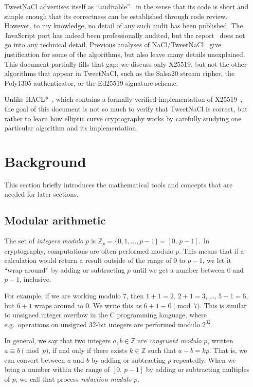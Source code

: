 \documentclass[manuscript]{acmart}
\begin{document}
TweetNaCl advertises itself as ``auditable''~\cite{Bernstein:2014ca} in the sense that its code is short and simple enough that its correctness can be established through code review.
However, to my knowledge, no detail of any such audit has been published.
The JavaScript port has indeed been professionally audited, but the report~\cite{TweetNaClAudit} does not go into any technical detail.
Previous analyses of NaCl/TweetNaCl~\cite{Bernstein:2009,Janssen:2014} give justification for some of the algorithms, but also leave many details unexplained.
This document partially fills that gap: we discuss only X25519, but not the other algorithms that appear in TweetNaCl, such as the Salsa20 stream cipher, the Poly1305 authenticator, or the Ed25519 signature scheme.

Unlike HACL*~\cite{HACLStar}, which contains a formally verified implementation of X25519~\cite{Zinzindohoue:2017fc}, the goal of this document is not so much to verify that TweetNaCl is correct, but rather to learn how elliptic curve cryptography works by carefully studying one particular algorithm and its implementation.

\section{Background}\label{sec:background}

This section briefly introduces the mathematical tools and concepts that are needed for later sections.

\subsection{Modular arithmetic}\label{sec:modular-arithmetic}

The set of \emph{integers modulo} $p$ is $\mathbb{Z}_p = \{0, 1, \dots, p-1\} = [0,\, p-1]$.
In cryptography, computations are often performed modulo $p$.
This means that if a calculation would return a result outside of the range of 0 to $p-1$, we let it ``wrap around'' by adding or subtracting $p$ until we get a number between 0 and $p-1$, inclusive.

For example, if we are working modulo 7, then $1+1=2$, $2+1=3$, \dots, $5+1=6$, but $6+1$ wraps around to $0$.
We write this as $6+1 \equiv 0 \pmod{7}$.
This is similar to unsigned integer overflow in the C programming language, where e.g.\ operations on unsigned 32-bit integers are performed modulo $2^{32}$.

In general, we say that two integers $a, b \in \mathbb{Z}$ are \emph{congruent modulo $p$}, written $a \equiv b \pmod{p}$, if and only if there exists $k \in \mathbb{Z}$ such that $a - b = kp$.
That is, we can convert between $a$ and $b$ by adding or subtracting $p$ repeatedly.
When we bring a number within the range of $[0,\, p-1]$ by adding or subtracting multiples of $p$, we call that process \emph{reduction modulo $p$}.
\end{document}
